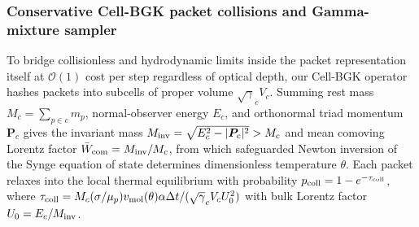 \subsubsection{Conservative Cell-BGK packet collisions and Gamma-mixture sampler}

To bridge collisionless and hydrodynamic limits inside the packet representation itself at $\mathcal{O}(1)$ cost per step regardless of optical depth, our Cell-BGK operator hashes packets into subcells of proper volume $\sqrt{\gamma}_c V_c$. Summing rest mass $M_c = \sum_{p\in c} m_p$, normal-observer energy $E_c$, and orthonormal triad momentum $\bm{P}_c$ gives the invariant mass $M_{\rm inv} = \sqrt{E_c^2 - |\bm{P}_c|^2} > M_c$ and mean comoving Lorentz factor $\bar{W}_{\rm com} = M_{\rm inv}/M_c$, from which safeguarded Newton inversion of the Synge equation of state determines dimensionless temperature $\theta$. Each packet relaxes into the local thermal equilibrium with probability $p_{\rm coll} = 1 - e^{-\tau_{\rm coll}}$, where $\tau_{\rm coll} = M_c (\sigma/\mu_p) v_{\rm mol}(\theta)\alpha\Delta t / (\sqrt{\gamma}_c V_c U_0^2)$ with bulk Lorentz factor $U_0 = E_c / M_{\rm inv}$.

